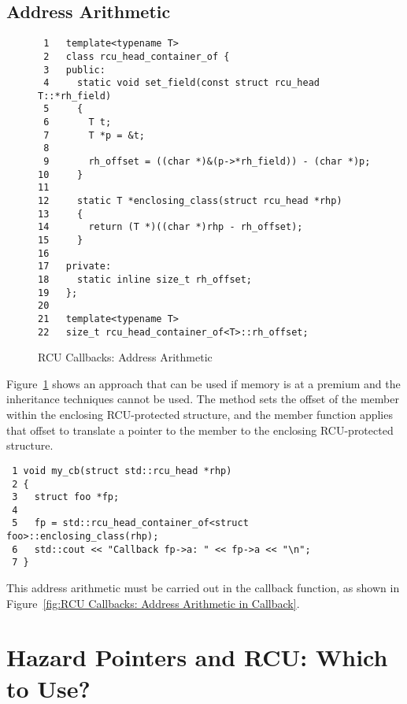 \documentclass[letterpaper,twocolumn,10pt]{article}
\begin{document}
\subsection{Address Arithmetic}
\label{sec:Address Arithmetic}

\begin{figure}[tbp]
{ \scriptsize
\begin{verbatim}
 1   template<typename T>
 2   class rcu_head_container_of {
 3   public:
 4     static void set_field(const struct rcu_head T::*rh_field)
 5     {
 6       T t;
 7       T *p = &t;
 8
 9       rh_offset = ((char *)&(p->*rh_field)) - (char *)p;
10     }
11
12     static T *enclosing_class(struct rcu_head *rhp)
13     {
14       return (T *)((char *)rhp - rh_offset);
15     }
16
17   private:
18     static inline size_t rh_offset;
19   };
20
21   template<typename T>
22   size_t rcu_head_container_of<T>::rh_offset;
\end{verbatim}
}
\caption{RCU Callbacks: Address Arithmetic}
\label{fig:RCU Callbacks: Address Arithmetic}
\end{figure}

Figure~\ref{fig:RCU Callbacks: Address Arithmetic}
shows an approach that can be used if memory is at a premium and
the inheritance techniques cannot be used.
The  method sets the offset of the
 member within the enclosing RCU-protected
structure, and the  member function
applies that offset to translate a pointer to the
 member to the enclosing RCU-protected structure.

\begin{figure*}[tbp]
{ \scriptsize
\begin{verbatim}
 1 void my_cb(struct std::rcu_head *rhp)
 2 {
 3   struct foo *fp;
 4
 5   fp = std::rcu_head_container_of<struct foo>::enclosing_class(rhp);
 6   std::cout << "Callback fp->a: " << fp->a << "\n";
 7 }
\end{verbatim}
}
\caption{RCU Callbacks: Address Arithmetic in Callback}
\label{fig:RCU Callbacks: Address Arithmetic in Callback}
\end{figure*}

This address arithmetic must be carried out in the callback function,
as shown in
Figure~\ref{fig:RCU Callbacks: Address Arithmetic in Callback}.

\section{Hazard Pointers and RCU: Which to Use?}
\label{sec:Hazard Pointers and RCU: Which to Use?}
\end{document}
